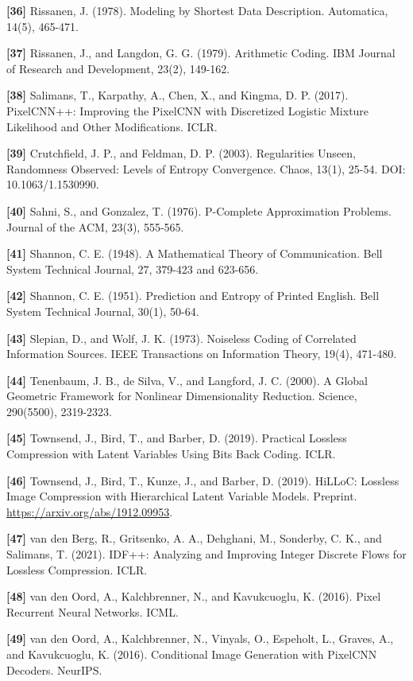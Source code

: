 \documentclass[
]{article}
\begin{document}
\textbf{{[}36{]}} Rissanen, J. (1978). Modeling by Shortest Data
Description. Automatica, 14(5), 465-471.

\textbf{{[}37{]}} Rissanen, J., and Langdon, G. G. (1979). Arithmetic
Coding. IBM Journal of Research and Development, 23(2), 149-162.

\textbf{{[}38{]}} Salimans, T., Karpathy, A., Chen, X., and Kingma, D.
P. (2017). PixelCNN++: Improving the PixelCNN with Discretized Logistic
Mixture Likelihood and Other Modifications. ICLR.

\textbf{{[}39{]}} Crutchfield, J. P., and Feldman, D. P. (2003).
Regularities Unseen, Randomness Observed: Levels of Entropy
Convergence. Chaos, 13(1), 25-54. DOI: 10.1063/1.1530990.

\textbf{{[}40{]}} Sahni, S., and Gonzalez, T. (1976). P-Complete
Approximation Problems. Journal of the ACM, 23(3), 555-565.

\textbf{{[}41{]}} Shannon, C. E. (1948). A Mathematical Theory of
Communication. Bell System Technical Journal, 27, 379-423 and 623-656.

\textbf{{[}42{]}} Shannon, C. E. (1951). Prediction and Entropy of
Printed English. Bell System Technical Journal, 30(1), 50-64.

\textbf{{[}43{]}} Slepian, D., and Wolf, J. K. (1973). Noiseless Coding
of Correlated Information Sources. IEEE Transactions on Information
Theory, 19(4), 471-480.

\textbf{{[}44{]}} Tenenbaum, J. B., de Silva, V., and Langford, J. C.
(2000). A Global Geometric Framework for Nonlinear Dimensionality
Reduction. Science, 290(5500), 2319-2323.

\textbf{{[}45{]}} Townsend, J., Bird, T., and Barber, D. (2019).
Practical Lossless Compression with Latent Variables Using Bits Back
Coding. ICLR.

\textbf{{[}46{]}} Townsend, J., Bird, T.,
Kunze, J., and Barber, D. (2019). HiLLoC: Lossless Image Compression with
Hierarchical Latent Variable Models. Preprint.
\url{https://arxiv.org/abs/1912.09953}.

\textbf{{[}47{]}} van den Berg, R., Gritsenko, A. A., Dehghani, M.,
Sonderby, C. K., and Salimans, T. (2021). IDF++: Analyzing and Improving
Integer Discrete Flows for Lossless Compression. ICLR.

\textbf{{[}48{]}} van den Oord, A., Kalchbrenner, N., and Kavukcuoglu,
K. (2016). Pixel Recurrent Neural Networks. ICML.

\textbf{{[}49{]}} van den Oord, A., Kalchbrenner, N., Vinyals, O.,
Espeholt, L., Graves, A., and Kavukcuoglu, K. (2016). Conditional Image
Generation with PixelCNN Decoders. NeurIPS.
\end{document}
